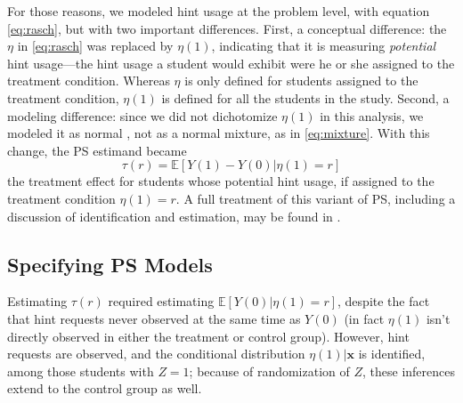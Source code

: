 \documentclass{article}\usepackage[]{graphicx}\usepackage[]{color}
\newcommand{\EE}{\mathbb{E}}
\begin{document}
For those reasons, we modeled hint usage at the problem level, with
equation \eqref{eq:rasch}, but with two important differences.
First, a conceptual difference: the $\eta$ in \eqref{eq:rasch} was
replaced by $\eta (1)$, indicating that it is measuring
\emph{potential} hint usage---the hint usage a student would exhibit
were he or she assigned to the treatment condition.
Whereas $\eta$ is only defined for students assigned to the treatment condition,
$\eta(1)$ is defined for all the students in the study.
Second, a modeling difference: since we did not dichotomize $\eta(1)$
in this analysis, we modeled it as normal , not as a normal mixture, as in
\eqref{eq:mixture}.
With this change, the PS estimand became
\begin{equation*}
\tau(r)=\EE[Y(1)-Y(0)|\eta(1)=r]
\end{equation*}
the treatment effect for students whose potential hint usage, if assigned to the treatment condition $\eta(1)=r$.
A full treatment of this variant of PS, including a
discussion of identification and estimation, may be found in
\citet{aoas}.



\subsection{Specifying PS Models}\label{sec:psModel}
Estimating $\tau(r)$ required estimating $\EE[Y(0)|\eta(1)=r]$,
despite the fact that hint requests never observed at the same time as
$Y(0)$ (in fact $\eta(1)$ isn't directly observed in either the
treatment or control group).
However, hint requests are observed, and the conditional distribution
$\eta(1)|\bm{x}$ is identified, among those students with $Z=1$;
because of randomization of $Z$, these inferences extend to the
control group as well.
\end{document}
